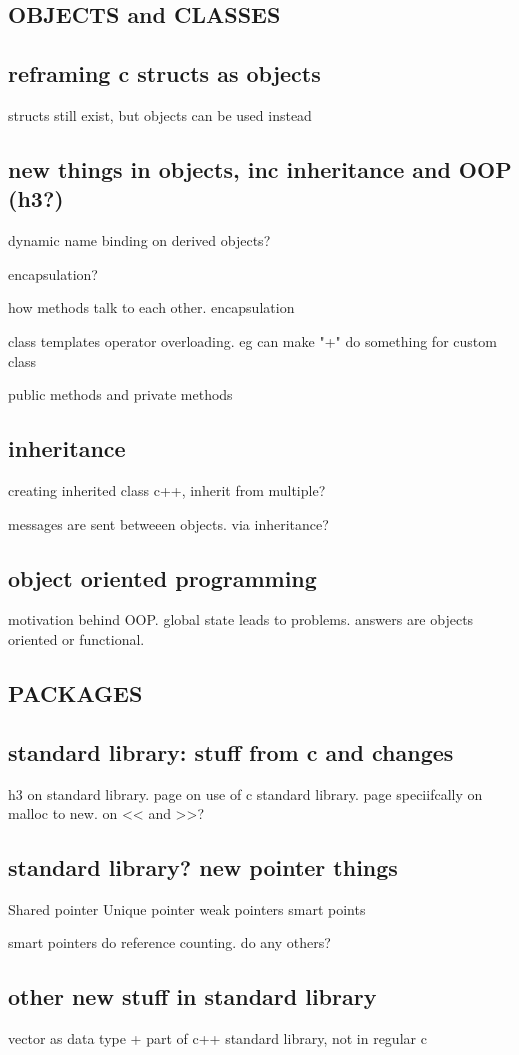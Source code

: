 \subsection{OBJECTS and CLASSES}
\subsection{reframing c structs as objects}
structs still exist, but objects can be used instead
\subsection{new things in objects, inc inheritance and OOP (h3?)}
dynamic name binding on derived objects?

encapsulation?

how methods talk to each other. encapsulation

class templates
operator overloading. eg can make "+" do something for custom class



public methods and private methods
\subsection{inheritance}
creating inherited class c++, inherit from multiple?

messages are sent betweeen objects. via inheritance?
\subsection{object oriented programming}
motivation behind OOP. global state leads to problems. answers are objects oriented or functional.
\subsection{PACKAGES}
\subsection{standard library: stuff from c and changes}
h3 on standard library. page on use of c standard library. page speciifcally on malloc to new. on << and >>?
\subsection{standard library? new pointer things}
Shared pointer
Unique pointer
weak pointers
smart points

smart pointers do reference counting. do any others?

\subsection{other new stuff in standard library}

vector as data type
+ part of c++ standard library, not in regular c


